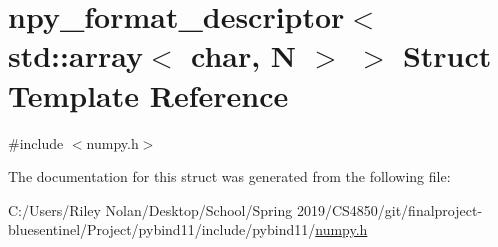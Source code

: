\hypertarget{structnpy__format__descriptor_3_01std_1_1array_3_01char_00_01_n_01_4_01_4}{}\section{npy\+\_\+format\+\_\+descriptor$<$ std\+::array$<$ char, N $>$ $>$ Struct Template Reference}
\label{structnpy__format__descriptor_3_01std_1_1array_3_01char_00_01_n_01_4_01_4}


{\ttfamily \#include $<$numpy.\+h$>$}



The documentation for this struct was generated from the following file\+:\begin{DoxyCompactItemize}
\item 
C\+:/\+Users/\+Riley Nolan/\+Desktop/\+School/\+Spring 2019/\+C\+S4850/git/finalproject-\/bluesentinel/\+Project/pybind11/include/pybind11/\mbox{\hyperlink{numpy_8h}{numpy.\+h}}\end{DoxyCompactItemize}
